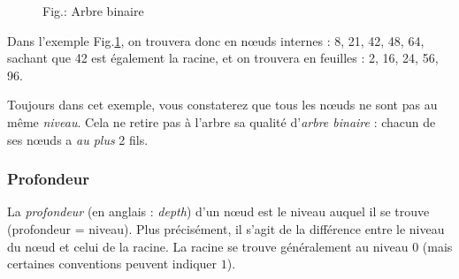 \documentclass[11pt,a4paper]{article}
\begin{document}
\begin{figure}[ht!]
\caption{Fig.\thefigure : Arbre binaire}
\label{fig:example1-binary-tree-1}
\end{figure}

\vspace*{-0.35cm} %

Dans l'exemple Fig.\ref{fig:example1-binary-tree-1}, on trouvera donc en nœuds internes : 8, 21, 42, 48, 64, sachant que 42 est également la racine, et on trouvera en feuilles : 2, 16, 24, 56, 96.

Toujours dans cet exemple, vous constaterez que tous les nœuds ne sont pas au même \textit{niveau}.
Cela ne retire pas à l'arbre sa qualité d'\textit{arbre binaire} : chacun de ses nœuds a \textit{au plus} 2 fils.


\subsubsection{Profondeur}

La \textit{profondeur} (en anglais : \textit{depth}) d'un nœud est le niveau auquel il se trouve (profondeur = niveau).
Plus précisément, il s'agit de la différence entre le niveau du nœud et celui de la racine.
La racine se trouve généralement au niveau $ 0 $ (mais certaines conventions peuvent indiquer $ 1 $).
\end{document}
